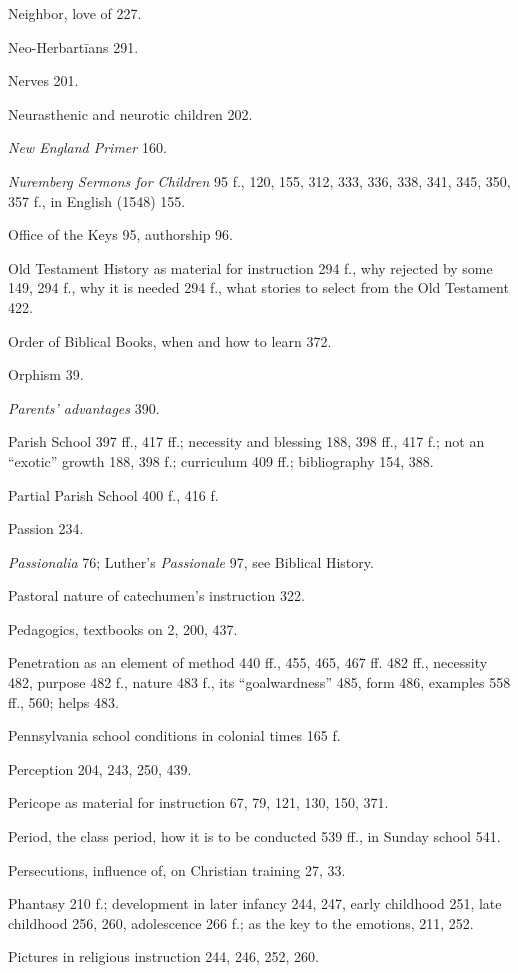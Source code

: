 Neighbor, love of 227.

Neo-Herbartīans 291.

Nerves 201.

Neurasthenic and neurotic children 202.

\emph{New England Primer} 160.

\emph{Nuremberg Sermons for Children} 95 f., 120, 155, 312, 333, 336, 338, 341, 345, 350, 357 f., in English (1548) 155.

Office of the Keys 95, authorship 96.

Old Testament History as material for instruction 294 f., why rejected by some 149, 294 f., why it is needed 294 f., what stories to select from the Old Testament 422.

Order of Biblical Books, when and how to learn 372.

Orphism 39.

\emph{Parents’ advantages} 390.

Parish School 397 ff., 417 ff.; necessity and blessing 188, 398 ff., 417 f.; not an “exotic” growth 188, 398 f.; curriculum 409 ff.; bibliography 154, 388.

Partial Parish School 400 f., 416 f.

Passion 234.

\emph{Passionalia} 76; Luther’s \emph{Passionale} 97, see Biblical History.

Pastoral nature of catechumen’s instruction 322.

Pedagogics, textbooks on 2, 200, 437.

Penetration as an element of method 440 ff., 455, 465, 467 ff. 482 ff.,
necessity 482, purpose 482 f., nature 483 f., its “goalwardness” 485, form 486, examples 558 ff., 560; helps 483.

Pennsylvania school conditions in colonial times 165 f.

Perception 204, 243, 250, 439.

Pericope as material for instruction 67, 79, 121, 130, 150, 371.

Period, the class period, how it is to be conducted 539 ff., in Sunday school 541.

Persecutions, influence of, on Christian training 27, 33.

Phantasy 210 f.; development in later infancy 244, 247, early childhood 251, late childhood 256, 260, adolescence 266 f.; as the key to the emotions, 211, 252.

Pictures in religious instruction 244, 246, 252, 260.

